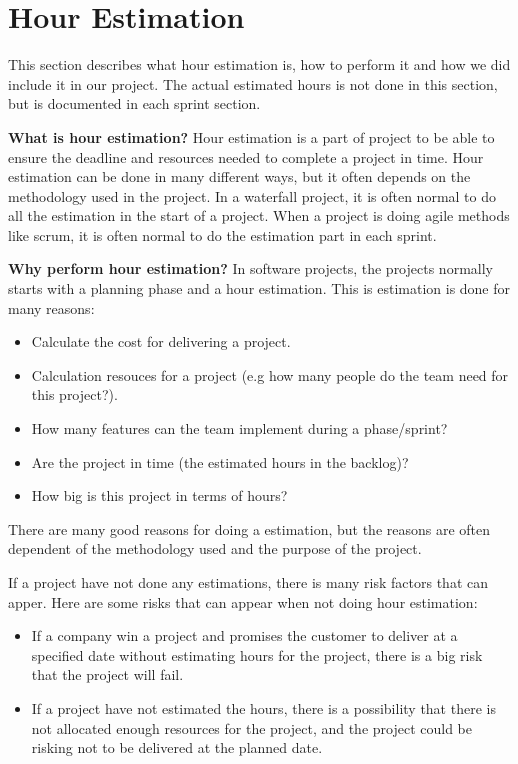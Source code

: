\section{Hour Estimation}

	This section describes what hour estimation is, how to perform it and how we did 
	include it in our project. The actual estimated hours is not done in this section, 
	but is documented in each sprint section.

	{\bf What is hour estimation?} Hour estimation is a part of project to be able to ensure the 
	deadline and resources needed to complete a project in time.
	Hour estimation can be done in many different ways, but it often depends on the methodology
	used in the project. 
	In a waterfall project, it is often normal to do all the estimation in the start of a project.
	When a project is doing agile methods like scrum, it is often normal to do the estimation part
	in each sprint. 

	{\bf Why perform hour estimation?} In software projects, the projects normally starts with
	a planning phase and a hour estimation. This is estimation is done for many reasons:
		\begin{itemize}
			\item Calculate the cost for delivering a project.
			\item Calculation resouces for a project (e.g how many people do the team 
			need for this project?).
			\item How many features can the team implement during a phase/sprint?
			\item Are the project in time (the estimated hours in the backlog)?
			\item How big is this project in terms of hours?
		\end{itemize}
	There are many good reasons for doing a estimation, but the reasons are often dependent
	of the methodology used and the purpose of the project. 

	If a project have not done any estimations, there is many risk factors that can apper. 
	Here are some risks that can appear when not doing hour estimation:
	\begin{itemize}
		\item If a company win a project and promises the customer to deliver at a 
		specified date without estimating hours for the project, there is a big risk 
		that the project will fail.
		\item If a project have not estimated the hours, there is a possibility that 
		there is not allocated enough resources for the project, and the project could 
		be risking not to be delivered at the planned date.  
	\end{itemize}

